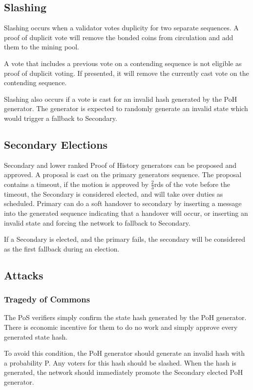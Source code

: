 \documentclass[12pt]{article}
\begin{document}
\subsection{Slashing}
Slashing occurs when a validator votes duplicity for two separate sequences.  A proof of duplicit vote will remove the bonded coins from circulation and add them to the mining pool.

A vote that includes a previous vote on a contending sequence is not eligible as proof of duplicit voting.  If presented, it will remove the currently cast vote on the contending sequence.

Slashing also occurs if a vote is cast for an invalid hash generated by the PoH generator.  The generator is expected to randomly generate an invalid state which would trigger a fallback to Secondary.
\subsection{Secondary Elections}
Secondary and lower ranked Proof of History generators can be proposed and approved.  A proposal is cast on the primary generators sequence.  The proposal contains a timeout, if the motion is approved by \(\frac{2}{3}\)rds of the vote before the timeout, the Secondary is considered elected, and will take over duties as scheduled.  Primary can do a soft handover to secondary by inserting a message into the generated sequence indicating that a handover will occur, or inserting an invalid state and forcing the network to fallback to Secondary.

If a Secondary is elected, and the primary fails, the secondary will be considered as the first fallback during an election.

\subsection{Attacks}
\subsubsection{Tragedy of Commons}

The PoS verifiers simply confirm the state hash generated by the PoH generator.  There is economic incentive for them to do no work and simply approve every generated state hash.  

To avoid this condition, the PoH generator should generate an invalid hash with a probability P.  Any voters for this hash should be slashed.  When the hash is generated, the network should immediately promote the Secondary elected PoH generator.
\end{document}
